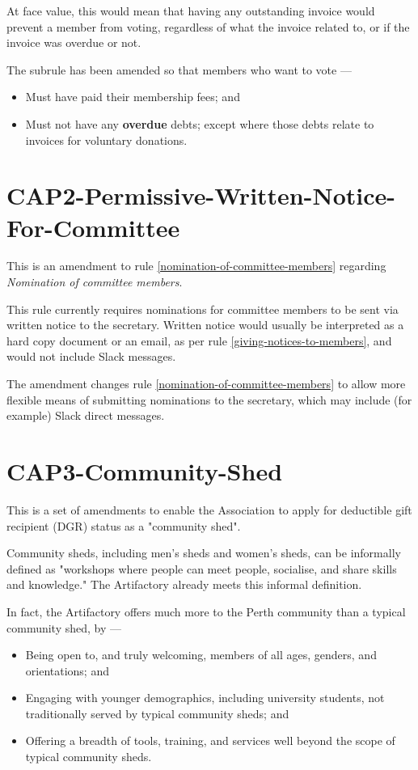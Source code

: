 \documentclass[../constitution.tex]{subfiles}
\begin{document}
At face value, this would mean that having any outstanding invoice would prevent a member from voting, regardless of what the invoice related to, or if the invoice was overdue or not.

The subrule has been amended so that members who want to vote ---

\begin{itemize}
    \item Must have paid their membership fees; and
    \item Must not have any \textbf{overdue} debts; except where those debts relate to invoices for voluntary donations.
\end{itemize}

\section*{CAP2-Permissive-Written-Notice-For-Committee}

This is an amendment to rule \ref{nomination-of-committee-members} regarding \textit{Nomination of committee members}.

This rule currently requires nominations for committee members to be sent via written notice to the secretary. Written notice would usually be interpreted as a hard copy document or an email, as per rule \ref{giving-notices-to-members}, and would not include Slack messages.

The amendment changes rule \ref{nomination-of-committee-members} to allow more flexible means of submitting nominations to the secretary, which may include (for example) Slack direct messages.

\section*{CAP3-Community-Shed}

This is a set of amendments to enable the Association to apply for deductible gift recipient (DGR) status as a "community shed".

Community sheds, including men's sheds and women's sheds, can be informally defined as "workshops where people can meet people, socialise, and share skills and knowledge." The Artifactory already meets this informal definition.

In fact, the Artifactory offers much more to the Perth community than a typical community shed, by ---

\begin{itemize}
    \item Being open to, and truly welcoming, members of all ages, genders, and orientations; and
    \item Engaging with younger demographics, including university students, not traditionally served by typical community sheds; and
    \item Offering a breadth of tools, training, and services well beyond the scope of typical community sheds.
\end{itemize}
\end{document}
